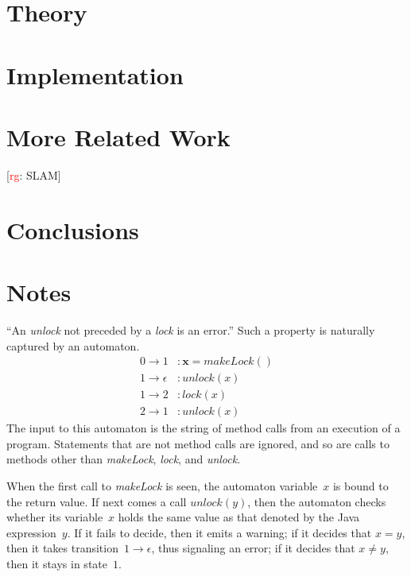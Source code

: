 \documentclass[a4paper]{article}
\newcommand{\rg}[1]{\todo{rg}{#1}}
\newcommand{\todo}[2]{{\small [\textcolor{red}{#1}: #2]}}
\theoremstyle{slanted}
\theoremstyle{definition}
\theoremstyle{remark}
\begin{document}
\section{Theory}

\section{Implementation}

\section{More Related Work}

\rg{SLAM}

\section{Conclusions}

\section{Notes}

``An \textit{unlock} not preceded by a \textit{lock} is an error.''
Such a property is naturally captured by an automaton.
\begin{equation}\label{eq:unlockunlock}
\begin{aligned}
0\to1&: \mathbf{x} = \mathit{makeLock}()\\
1\to\epsilon&: \mathit{unlock}(x)\\
1\to2&: \mathit{lock}(x)\\
2\to1&: \mathit{unlock}(x)
\end{aligned}
\end{equation}
The input to this automaton is the string of method calls from an execution of a program.
Statements that are not method calls are ignored, and so are calls to methods other than \textit{makeLock}, \textit{lock}, and \textit{unlock}.

When the first call to \textit{makeLock} is seen, the automaton variable~$x$ is bound to the return value.
If next comes a call $\mathit{unlock}(y)$, then the automaton checks whether its variable~$x$ holds the same value as that denoted by the Java expression~$y$.
If it fails to decide, then it emits a warning; if it decides that $x=y$, then it takes transition~$1\to\epsilon$, thus signaling an error; if it decides that $x\ne y$, then it stays in state~$1$.
\end{document}
